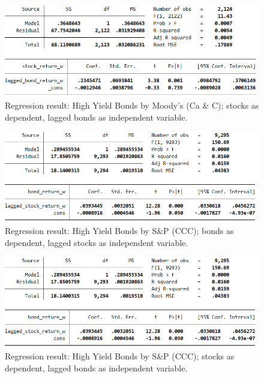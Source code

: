 \begin{figure}[h]
	\centering
	\includegraphics[width=1.0\linewidth]{figures/regression-results/regression-high-yield-ccc-d-moodies-stocks-as-dependent.PNG}
	\caption{Regression result: High Yield Bonds by Moody's (Ca \& C); stocks as dependent, lagged bonds as independent variable. }
	\label{fig:regression-high-yield-moodys-stocks-as-dependent}
\end{figure}

\begin{figure}[h]
	\centering
	\includegraphics[width=1.0\linewidth]{figures/regression-results/regression-high-yield-sandp-bonds-as-dependent.PNG}
	\caption{Regression result: High Yield Bonds by S\&P (CCC); bonds as dependent, lagged stocks as independent variable. }
	\label{fig:regression-high-yield-sandp-bonds-as-dependent}
\end{figure}

\begin{figure}[h]
	\centering
	\includegraphics[width=1.0\linewidth]{figures/regression-results/regression-high-yield-sandp-bonds-as-dependent.PNG}
	\caption{Regression result: High Yield Bonds by S\&P (CCC); stocks as dependent, lagged bonds as independent variable. }
	\label{fig:regression-high-yield-sandp-stocks-as-dependent}
\end{figure}

